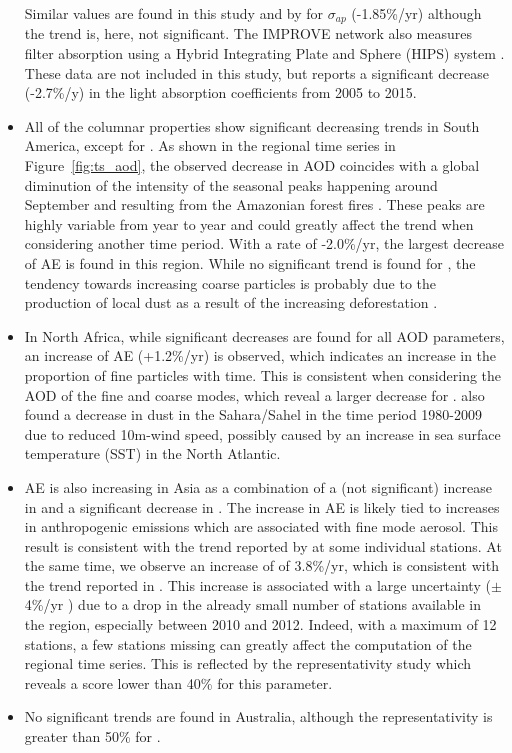 \documentclass[acp, manuscript]{copernicus}
\begin{document}
\begin{itemize}
 Similar values are found in this study and by \cite{collaudcoen-2019} for $\sigma_{ap}$ (-1.85\%/yr) although the trend is, here, not significant. The IMPROVE network also measures filter absorption using a Hybrid Integrating Plate and Sphere (HIPS) system \citep{Warren2016}. These data are not included in this study, but \cite{Warren2016} reports a significant decrease (-2.7\%/y) in the light absorption coefficients from 2005 to 2015.
 \item All of the columnar properties show significant decreasing trends in South America, except for . As shown in the regional time series in Figure~\ref{fig:ts_aod}, the observed decrease in AOD coincides with a global diminution of the intensity of the seasonal peaks happening around September and resulting from the Amazonian forest fires \citep{aragao201821st}. These peaks are highly variable from year to year and could greatly affect the trend when considering another time period. With a rate of -2.0\%/yr, the largest decrease of AE is found in this region. While no significant trend is found for , the tendency towards increasing coarse particles is probably due to the production of local dust as a result of the increasing deforestation \citep{werth2002local,betts2008effects}.
 \item In North Africa, while significant decreases are found for all AOD parameters, an increase of AE (+1.2\%/yr) is observed, which indicates an increase in the proportion of fine particles with time. This is consistent when considering the AOD of the fine and coarse modes, which reveal a larger decrease for . \cite{chin2014multi} also found a decrease in dust in the Sahara/Sahel in the time period 1980-2009 due to reduced 10m-wind speed, possibly caused by an increase in sea surface temperature (SST) in the North Atlantic.
 \item AE is also increasing in Asia as a combination of a (not significant) increase in  and a significant decrease in . The increase in AE is likely tied to increases in anthropogenic emissions which are associated with fine mode aerosol. This result is consistent with the trend reported by \cite{yoon2012trend} at some individual stations. At the same time, we observe an increase of  of 3.8\%/yr, which is consistent with the trend reported in \cite{aas2019global}. This increase is associated with a large uncertainty ($\pm$4\%/yr ) due to a drop in the already small number of stations available in the region, especially between 2010 and 2012. Indeed, with a maximum of 12 stations, a few stations missing can greatly affect the computation of the regional time series. This is reflected by the representativity study which reveals a score lower than 40\% for this parameter.
 \item No significant trends are found in Australia, although the representativity is greater than 50\% for .

\end{itemize}
\end{document}
